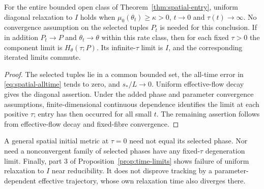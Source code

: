 \begin{corollary}\label{cor:spatial-limits}
For the entire bounded open class of Theorem~\ref{thm:spatial-entry},
uniform diagonal relaxation to $I$ holds when
$\mu_0(\theta_t)\ge\kappa>0$, $t\to0$ and $\tau(t)\to\infty$.
No convergence assumption on the selected tuples $P_t$ is needed for
this conclusion. If in addition $P_t\to P$ and $\theta_t\to\theta$
within this rate class, then for each fixed $\tau>0$ the component
limit is $H_\theta(\tau;P)$. Its infinite-$\tau$ limit is $I$,
and the corresponding iterated limits commute.
\end{corollary}
\begin{proof}
The selected tuples lie in a common bounded set, the all-time error
in \eqref{eq:spatial-alltime} tends to zero, and $s_*/L\to0$.
Uniform effective-flow decay gives the diagonal assertion. Under the added
phase and parameter convergence assumptions, finite-dimensional continuous
dependence identifies the limit at each positive $\tau$; entry has
then occurred for all small $t$. The remaining assertion follows
from effective-flow decay and fixed-fibre convergence.
\end{proof}

A general spatial initial metric at $\tau=0$ need not equal its
selected phase. Nor need a nonconvergent family of selected phases
have any fixed-$\tau$ degeneration limit. Finally, part 3 of
Proposition~\ref{prop:time-limits} shows failure of uniform relaxation
to $I$ near reducibility. It does not disprove tracking by a
parameter-dependent effective trajectory, whose own relaxation time
also diverges there.
